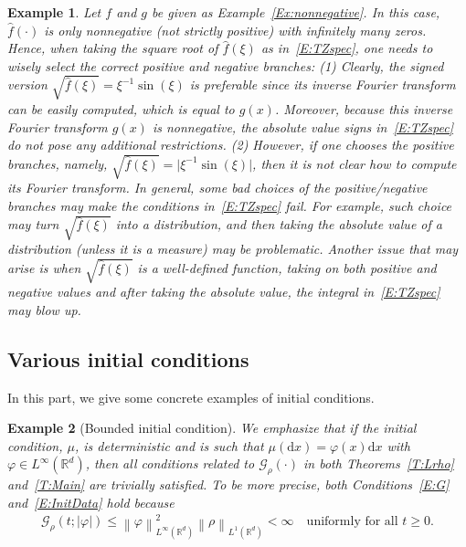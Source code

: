 \documentclass[sn-mathphys]{sn-jnl}%
\newcommand{\BR}{\mathbb{R}}
\newcommand{\Norm}[1]{\left\| #1 \right\|}
\newcommand{\ud}{\ensuremath{\mathrm{d}}}
\numberwithin{equation}{section}
\theoremstyle{thmstyleone}%
\theoremstyle{thmstyletwo}%
\newtheorem{example}{Example}[section]%
\theoremstyle{thmstylethree}%
\begin{document}
\begin{example}\label{Ex:sqrt}
  Let $f$ and $g$ be given as Example~\ref{Ex:nonnegative}. In this case, $\widehat{f}(\cdot)$ is
  only nonnegative (not strictly positive) with infinitely many zeros. Hence, when taking the square
  root of $\widehat{f}(\xi)$ as in~\eqref{E:TZspec}, one needs to wisely select the correct positive
  and negative branches: (1) Clearly, the signed version $\sqrt{\widehat{f}(\xi)} =
  \xi^{-1}\sin(\xi)$ is preferable since its inverse Fourier transform can be easily computed, which
  is equal to $g(x)$. Moreover, because this inverse Fourier transform $g(x)$ is nonnegative, the
  absolute value signs in~\eqref{E:TZspec} do not pose any additional restrictions. (2) However, if
  one chooses the positive branches, namely, $\sqrt{\widehat{f}(\xi)} =
  \lvert\xi^{-1}\sin(\xi)\rvert$, then it is not clear how to compute its Fourier transform. In
  general, some bad choices of the positive/negative branches may make the conditions
  in~\eqref{E:TZspec} fail. For example, such choice may turn $\sqrt{\widehat{f}(\xi)}$ into a
  distribution, and then taking the absolute value of a distribution (unless it is a measure) may be
  problematic. Another issue that may arise is when $\sqrt{\widehat{f}(\xi)}$ is a well-defined
  function, taking on both positive and negative values and after taking the absolute value, the
  integral in~\eqref{E:TZspec} may blow up.
\end{example}

\subsection{Various initial conditions}\label{SS:Init}

In this part, we give some concrete examples of initial conditions.

\begin{example}[Bounded initial condition]\label{Ex:BddInit}
  We emphasize that if the initial condition, $\mu$, is deterministic and is such that $\mu(\ud x) =
  \varphi(x)\ud x$ with $\varphi\in L^\infty(\BR^d)$, then all conditions related to
  $\mathcal{G}_\rho(\cdot)$ in both Theorems~\ref{T:Lrho} and~\ref{T:Main} are trivially satisfied.
  To be more precise, both Conditions~\eqref{E:G} and~\eqref{E:InitData} hold because
  \begin{align*}
    \mathcal{G}_\rho(t;\lvert \varphi \rvert) \le \Norm{\varphi}_{L^\infty(\BR^d)}^2 \Norm{\rho}_{L^1 (\BR^d)}< \infty
    \quad \text{uniformly for all $t\ge 0$.}
  \end{align*}
\end{example}
\end{document}
